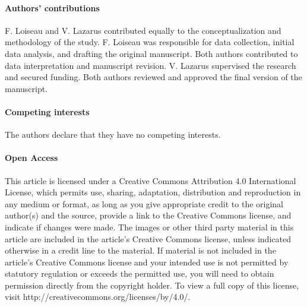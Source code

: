 \documentclass[OptSoft]{jtcam_preprint}
\begin{document}

\paragraph{Authors' contributions}
  F. Loiseau and V. Lazarus contributed equally to the conceptualization and methodology of the study.
  F. Loiseau was responsible for data collection, initial data analysis, and drafting the original manuscript.
  Both authors contributed to data interpretation and manuscript revision.
  V. Lazarus supervised the research and secured funding.
  Both authors reviewed and approved the final version of the manuscript.

\paragraph{Competing interests}
The authors declare that they have no competing interests.

\paragraph{Open Access} This article is licensed under a Creative Commons Attribution 4.0 International License, which permits use, sharing, adaptation, distribution and reproduction in any medium or format, as long as you give appropriate credit to the original author(s) and the source, provide a link to the Creative Commons license, and indicate if changes were made. The images or other third party material in this article are included in the article's Creative Commons license, unless indicated otherwise in a credit line to the material. If material is not included in the article's Creative Commons license and your intended use is not permitted by statutory regulation or exceeds the permitted use, you will need to obtain permission directly from the copyright holder. To view a full copy of this license, visit http://creativecommons.org/licenses/by/4.0/.


\printbibliography

\end{document}
